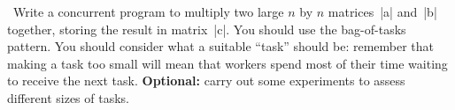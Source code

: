 \begin{question}
\Programming\ Write a concurrent program to multiply two large $n$ by $n$
matrices~|a| and~|b| together, storing the result in matrix~|c|.  You should
use the bag-of-tasks pattern.  You should consider what a suitable ``task''
should be: remember that making a task too small will mean that workers spend
most of their time waiting to receive the next task.  \textbf{Optional:} carry
out some experiments to assess different sizes of tasks.
\end{question}


